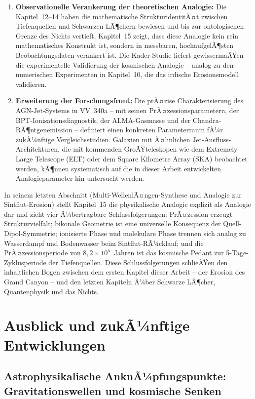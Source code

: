 ﻿\documentclass[12pt,a4paper]{report}
\begin{document}
\begin{enumerate}
	\item \textbf{Observationelle Verankerung der theoretischen Analogie:} Die Kapitel~12--14 haben die mathematische StrukturidentitÃ¤t zwischen Tiefenquellen und Schwarzen LÃ¶chern bewiesen und bis zur ontologischen Grenze des Nichts vertieft. Kapitel~15 zeigt, dass diese Analogie kein rein mathematisches Konstrukt ist, sondern in messbaren, hochaufgelÃ¶sten Beobachtungsdaten verankert ist. Die Kader-Studie liefert gewissermaÃŸen die experimentelle Validierung der kosmischen Analogie -- analog zu den numerischen Experimenten in Kapitel~10, die das irdische Erosionsmodell validieren.

	\item \textbf{Erweiterung der Forschungsfront:} Die prÃ¤zise Charakterisierung des AGN-Jet-Systems in VV~340a -- mit seinen PrÃ¤zessionsparametern, der BPT-Ionisationsdiagnos\-tik, der ALMA-Gasmasse und der Chandra-RÃ¶ntgenemission -- definiert einen konkreten Parameterraum fÃ¼r zukÃ¼nftige Vergleichsstudien. Galaxien mit Ã¤hnlichen Jet-Ausfluss-Architekturen, die mit kommenden GroÃŸteleskopen wie dem Extremely Large Telescope (ELT) oder dem Square Kilometre Array (SKA) beobachtet werden, kÃ¶nnen systematisch auf die in dieser Arbeit entwickelten Analogieparameter hin untersucht werden.
\end{enumerate}

In seinem letzten Abschnitt (\glqq Multi-WellenlÃ¤ngen-Synthese und Analogie zur Sintflut-Erosion\grqq{}) stellt Kapitel~15 die physikalische Analogie explizit als Analogie dar und zieht vier Ã¼bertragbare Schlussfolgerungen: PrÃ¤zession erzeugt Strukturvielfalt; bikonale Geometrie ist eine universelle Konsequenz der Quell-Dipol-Symmetrie; ionisierte Phase und molekulare Phase trennen sich analog zu Wasserdampf und Bodenwasser beim Sintflut-RÃ¼cklauf; und die PrÃ¤zessionsperiode von $8{,}2 \times 10^5$~Jahren ist das kosmische Pedant zur 5-Tage-Zyklusperiode der Tiefenquellen. Diese Schlussfolgerungen schlieÃŸen den inhaltlichen Bogen zwischen dem ersten Kapitel dieser Arbeit -- der Erosion des Grand Canyon -- und den letzten Kapiteln Ã¼ber Schwarze LÃ¶cher, Quantenphysik und das Nichts.

\section{Ausblick und zukÃ¼nftige Entwicklungen}

\subsection{Astrophysikalische AnknÃ¼pfungspunkte: Gravitationswellen und kosmische Senken}
\end{document}
